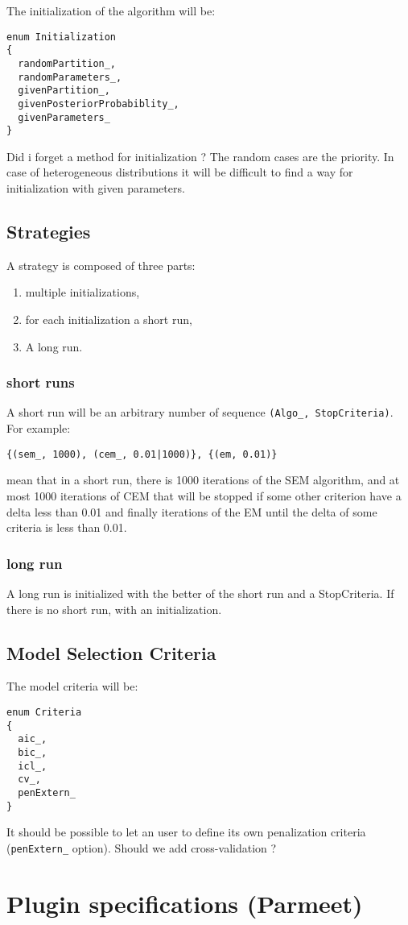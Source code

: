 \documentclass[iutinfo, cadre]{ens-ustl}
\begin{document}
The initialization of the algorithm will be:
\begin{verbatim}
enum Initialization
{
  randomPartition_,
  randomParameters_,
  givenPartition_,
  givenPosteriorProbabiblity_,
  givenParameters_
}
\end{verbatim}

Did i forget a method for initialization ? The random cases are the priority.
In case of heterogeneous distributions it will be difficult to find a way for initialization with
given parameters.

\subsection{Strategies}

A strategy is composed of three parts:
\begin{enumerate}
  \item multiple initializations,
  \item for each initialization a short run,
  \item A long run.
\end{enumerate}

\subsubsection{short runs}

A short run will be an arbitrary number of sequence \verb+(Algo_, StopCriteria)+. For example:
\begin{verbatim}
{(sem_, 1000), (cem_, 0.01|1000)}, {(em, 0.01)}
\end{verbatim}
mean that in a short run, there is 1000 iterations of the SEM algorithm, and at most 1000 iterations
of CEM that will be stopped  if some other criterion have a delta less than 0.01 and finally iterations of the EM
until the delta of some criteria is less than 0.01.

\subsubsection{long run}

A long run is initialized with the better of the short run and a StopCriteria.
If there is no short run, with an initialization.

\subsection{Model Selection Criteria}
The model criteria will be:
\begin{verbatim}
enum Criteria
{
  aic_,
  bic_,
  icl_,
  cv_,
  penExtern_
}
\end{verbatim}
It should be possible to let an user to define its own penalization criteria (\verb+penExtern_+ option).
Should we add cross-validation ?

\section{Plugin specifications (Parmeet) }
\end{document}
